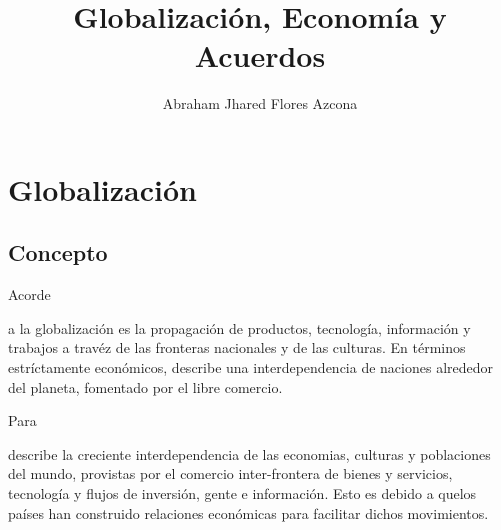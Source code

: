 \documentclass[stu, 12pt, letterpaper, donotrepeattitle, floatsintext, natbib]{apa7}
\title{\Large Globalización, Economía y Acuerdos}
\author{Abraham Jhared Flores Azcona} %
\affiliation{Instituto Tecnológico de Tijuana}
\begin{document}
\maketitle


\renewcommand\contentsname{Contenido}
\tableofcontents
\renewcommand{\listfigurename}{Figuras}
\listoffigures

\newpage
\section{Globalización}
\subsection{Concepto}
Acorde \begin{justifying}
  a \cite{fernando-2020}%
  la globalización es la propagación de productos, tecnología, información y trabajos a travéz
  de las fronteras nacionales y de las culturas. En términos estríctamente económicos, describe una 
  interdependencia de naciones alrededor del planeta, fomentado por el libre comercio.\par
\end{justifying}
Para \begin{justifying}
  \cite{kolb-2018}%
  describe la creciente interdependencia de las economias, culturas y poblaciones del mundo, provistas
  por el comercio inter-frontera de bienes y servicios, tecnología y flujos de inversión, gente e información.
  Esto es debido a quelos países han construido relaciones económicas para facilitar dichos movimientos.\par
\end{justifying}
\vspace{\baselineskip}
\end{document}
